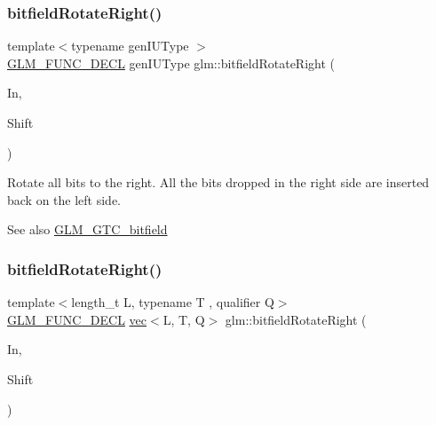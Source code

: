 \subsubsection{\texorpdfstring{bitfield\+Rotate\+Right()}{bitfieldRotateRight()}\hspace{0.1cm}{\footnotesize\ttfamily [1/2]}}
{\footnotesize\ttfamily template$<$typename gen\+I\+U\+Type $>$ \\
\mbox{\hyperlink{setup_8hpp_ab2d052de21a70539923e9bcbf6e83a51}{G\+L\+M\+\_\+\+F\+U\+N\+C\+\_\+\+D\+E\+CL}} gen\+I\+U\+Type glm\+::bitfield\+Rotate\+Right (\begin{DoxyParamCaption}\item[{gen\+I\+U\+Type}]{In,  }\item[{int}]{Shift }\end{DoxyParamCaption})}

Rotate all bits to the right. All the bits dropped in the right side are inserted back on the left side.

\begin{DoxySeeAlso}{See also}
\mbox{\hyperlink{group__gtc__bitfield}{G\+L\+M\+\_\+\+G\+T\+C\+\_\+bitfield}} 
\end{DoxySeeAlso}
\mbox{\label{group__gtc__bitfield_ga590488e1fc00a6cfe5d3bcaf93fbfe88}} 
\subsubsection{\texorpdfstring{bitfield\+Rotate\+Right()}{bitfieldRotateRight()}\hspace{0.1cm}{\footnotesize\ttfamily [2/2]}}
{\footnotesize\ttfamily template$<$length\+\_\+t L, typename T , qualifier Q$>$ \\
\mbox{\hyperlink{setup_8hpp_ab2d052de21a70539923e9bcbf6e83a51}{G\+L\+M\+\_\+\+F\+U\+N\+C\+\_\+\+D\+E\+CL}} \mbox{\hyperlink{structglm_1_1vec}{vec}}$<$L, T, Q$>$ glm\+::bitfield\+Rotate\+Right (\begin{DoxyParamCaption}\item[{\mbox{\hyperlink{structglm_1_1vec}{vec}}$<$ L, T, Q $>$ const \&}]{In,  }\item[{int}]{Shift }\end{DoxyParamCaption})}

